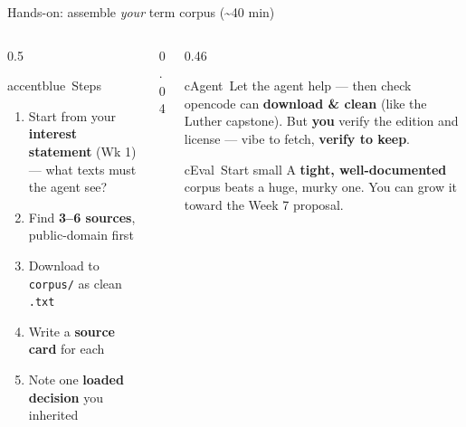 \begin{frame}{Hands-on: assemble \emph{your} term corpus (\textasciitilde40 min)}
  \begin{columns}[t, totalwidth=\textwidth]
    \begin{column}{0.5\textwidth}
      \begin{featbox}{accentblue}{\faListOl\ Steps}
        \small
        \begin{enumerate}
          \item Start from your \textbf{interest statement} (Wk 1) --- what texts must the agent see?
          \item Find \textbf{3--6 sources}, public-domain first
          \item Download to \texttt{corpus/} as clean \texttt{.txt}
          \item Write a \textbf{source card} for each
          \item Note one \textbf{loaded decision} you inherited
        \end{enumerate}
      \end{featbox}
    \end{column}
    \begin{column}{0.04\textwidth}\end{column}
    \begin{column}{0.46\textwidth}
      \begin{featbox}{cAgent}{\faRobot\ Let the agent help --- then check}
        \scriptsize
        opencode can \textbf{download \& clean} (like the Luther capstone). But \textbf{you}
        verify the edition and license --- vibe to fetch, \textbf{verify to keep}.
      \end{featbox}
      \vspace{4pt}
      \begin{featbox}{cEval}{\faSeedling\ Start small}
        \scriptsize A \textbf{tight, well-documented} corpus beats a huge, murky one.
        You can grow it toward the Week 7 proposal.
      \end{featbox}
    \end{column}
  \end{columns}
\end{frame}

